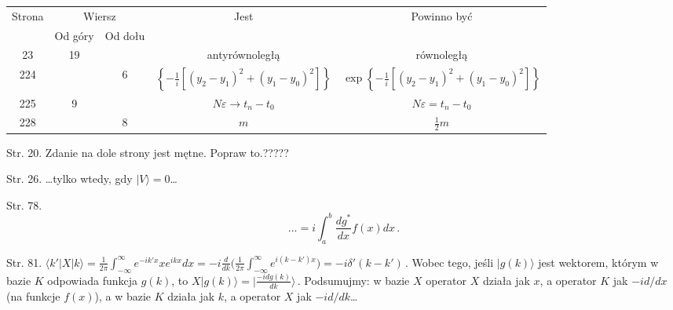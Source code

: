 \documentclass[a4paper,11pt]{article}
\numberwithin{equation}{section}
\begin{document}
\begin{center}

  \begin{tabular}{|c|c|c|c|c|}
    \hline
    Strona & \multicolumn{2}{c|}{Wiersz} & Jest
                              & Powinno być \\ \cline{2-3}
    & Od góry & Od dołu & & \\
    \hline
    23 & 19 & & antyrównoległą & równoległą \\
    224 & & 6 & $\left\{ -\frac{ 1 }{ i } [ ( y_{ 2  } - y_{ 1 } )^{ 2 }
                + ( y_{ 1 } - y_{ 0 } )^{ 2 } ] \right\}$
           & $\exp\left\{ -\frac{ 1 }{ i } [ ( y_{ 2  } - y_{ 1 } )^{ 2 }
             + ( y_{ 1 } - y_{ 0 } )^{ 2 } ] \right\}$ \\
    225 & 9 & & $N \varepsilon \to t_{ n } - t_{ 0 }$
           & $N \varepsilon = t_{ n } - t_{ 0 }$ \\
    228 & & 8 & $m$ & $\frac{ 1 }{ 2 } m$ \\
    \hline
  \end{tabular}

\end{center}

\VerSpaceTwo


\noindent
Str. 20. Zdanie na dole strony jest mętne. Popraw to.?????

Str. 26. \ldots tylko wtedy, gdy $| V \rangle = 0$\ldots

Str. 78. %
$$\ldots = i \int_{ a }^{ b } \frac{ dg^{ * } }{ dx } f( x ) d x \, .$$

Str. 81.
$\langle k' | X | k \rangle = \frac{ 1 }{ 2 \pi } \int_{ -\infty
  }^{ \infty } e^{ -i k' x } x e^{ i k x } d x = -i \frac{ d }{ dk } \bigg( \frac{ 1 }{ 2 \pi } \int_{ -\infty }^{ \infty } e^{ i ( k - k' ) x } \bigg) = -i \delta'( k - k' ) \, .$ Wobec tego, jeśli $| g( k ) \rangle$ jest wektorem, którym w bazie $K$
 odpowiada funkcja $g( k )$, to
$X| g( k ) \rangle = \bigg| \frac{ -i d g( k ) }{ d k } \bigg\rangle \, .$
Podsumujmy: w bazie $X$ operator $X$ działa jak $x$, a operator $K$
jak $-i d / d x$ (na funkcje $f( x )$), a w bazie $K$ działa jak
$k$, a operator $X$ jak $-i d / d k$\ldots






\end{document}
